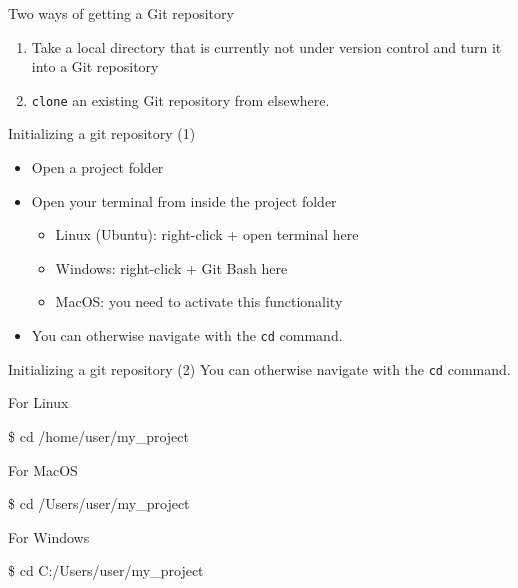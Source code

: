 \documentclass[handout]{beamer}
\begin{document}

\begin{frame}{Two ways of getting a Git repository}
	\begin{enumerate}
		\item Take a local directory that is currently not under version control and turn it into a Git repository
		\item \texttt{clone} an existing Git repository from elsewhere.
	\end{enumerate}
\end{frame}

\begin{frame}{Initializing a git repository (1)}
	\begin{itemize}
		\item Open a project folder
		\item Open your terminal from inside the project folder
		\begin{itemize}
			\item Linux (Ubuntu): right-click + open terminal here
			\item Windows: right-click + Git Bash here
			\item MacOS: you need to activate this functionality
    \end{itemize}
    \item You can otherwise navigate with the \texttt{cd} command.
  \end{itemize}
\end{frame}

\begin{frame}{Initializing a git repository (2)}
You can otherwise navigate with the \texttt{cd} command.
	\begin{exampleblock}{For Linux}
		\begin{semiverbatim}
			\item \$ cd /home/user/my\_project
		\end{semiverbatim}
  \end{exampleblock}
  \begin{exampleblock}{For MacOS}
  	\begin{semiverbatim}
  		\item \$ cd /Users/user/my\_project
  	\end{semiverbatim}
  \end{exampleblock}
  \begin{exampleblock}{For Windows}
  	\begin{semiverbatim}
  		\item \$ cd C:/Users/user/my\_project
  	\end{semiverbatim}
  \end{exampleblock}
\end{frame}
\end{document}
